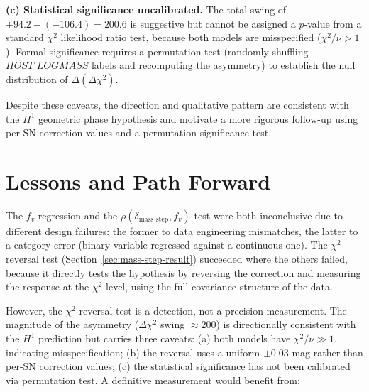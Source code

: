 \documentclass[11pt]{article}
\begin{document}
\textbf{(c) Statistical significance uncalibrated.} The total swing
of $+94.2 - (-106.4) = 200.6$ is suggestive but cannot be assigned
a $p$-value from a standard $\chi^2$ likelihood ratio test, because
both models are misspecified ($\chi^2/\nu > 1$). Formal significance
requires a permutation test (randomly shuffling $HOST\_LOGMASS$
labels and recomputing the asymmetry) to establish the null
distribution of $\Delta(\Delta\chi^2)$.

Despite these caveats, the direction and qualitative pattern are
consistent with the $H^1$ geometric phase hypothesis and motivate
a more rigorous follow-up using per-SN correction values and a
permutation significance test.

\section{Lessons and Path Forward}
\label{sec:lessons}

The $f_v$ regression and the $\rho(\delta_{\text{mass step}}, f_v)$
test were both inconclusive due to different design failures:
the former to data engineering mismatches, the latter to a
category error (binary variable regressed against a continuous one).
The $\chi^2$ reversal test (Section~\ref{sec:mass-step-result})
succeeded where the others failed, because it directly tests the
hypothesis by reversing the correction and measuring the response
at the $\chi^2$ level, using the full covariance structure of the data.

However, the $\chi^2$ reversal test is a detection, not a precision
measurement. The magnitude of the asymmetry ($\Delta\chi^2$ swing
$\approx 200$) is directionally consistent with the $H^1$ prediction
but carries three caveats: (a) both models have $\chi^2/\nu \gg 1$,
indicating misspecification; (b) the reversal uses a uniform
$\pm 0.03$ mag rather than per-SN correction values; (c) the
statistical significance has not been calibrated via permutation
test. A definitive measurement would benefit from:
\end{document}
